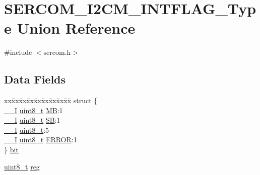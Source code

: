 \hypertarget{union_s_e_r_c_o_m___i2_c_m___i_n_t_f_l_a_g___type}{}\section{S\+E\+R\+C\+O\+M\+\_\+\+I2\+C\+M\+\_\+\+I\+N\+T\+F\+L\+A\+G\+\_\+\+Type Union Reference}
\label{union_s_e_r_c_o_m___i2_c_m___i_n_t_f_l_a_g___type}


{\ttfamily \#include $<$sercom.\+h$>$}

\subsection*{Data Fields}
\begin{DoxyCompactItemize}
\item 
\begin{tabbing}
xx\=xx\=xx\=xx\=xx\=xx\=xx\=xx\=xx\=\kill
struct \{\\
\>\mbox{\hyperlink{core__cm0plus_8h_af63697ed9952cc71e1225efe205f6cd3}{\_\_I}} \mbox{\hyperlink{union_s_e_r_c_o_m___i2_c_m___i_n_t_f_l_a_g___type_a5b4208c6f4c4a4290c4f2804d1eb1d5b}{uint8\_t}} \mbox{\hyperlink{union_s_e_r_c_o_m___i2_c_m___i_n_t_f_l_a_g___type_a0301020d471a9e6fd068eeee88394fe8}{MB}}:1\\
\>\mbox{\hyperlink{core__cm0plus_8h_af63697ed9952cc71e1225efe205f6cd3}{\_\_I}} \mbox{\hyperlink{union_s_e_r_c_o_m___i2_c_m___i_n_t_f_l_a_g___type_a5b4208c6f4c4a4290c4f2804d1eb1d5b}{uint8\_t}} \mbox{\hyperlink{union_s_e_r_c_o_m___i2_c_m___i_n_t_f_l_a_g___type_ac6add1ec2bf6a0ae4dce09e4829d4ef0}{SB}}:1\\
\>\mbox{\hyperlink{core__cm0plus_8h_af63697ed9952cc71e1225efe205f6cd3}{\_\_I}} \mbox{\hyperlink{union_s_e_r_c_o_m___i2_c_m___i_n_t_f_l_a_g___type_a5b4208c6f4c4a4290c4f2804d1eb1d5b}{uint8\_t}}:5\\
\>\mbox{\hyperlink{core__cm0plus_8h_af63697ed9952cc71e1225efe205f6cd3}{\_\_I}} \mbox{\hyperlink{union_s_e_r_c_o_m___i2_c_m___i_n_t_f_l_a_g___type_a5b4208c6f4c4a4290c4f2804d1eb1d5b}{uint8\_t}} \mbox{\hyperlink{union_s_e_r_c_o_m___i2_c_m___i_n_t_f_l_a_g___type_ab083f63120ce20369e2dbb0081da16e3}{ERROR}}:1\\
\} \mbox{\hyperlink{union_s_e_r_c_o_m___i2_c_m___i_n_t_f_l_a_g___type_a4821bdfc65e3873048e7d47e3204d670}{bit}}\\

\end{tabbing}\item 
\mbox{\hyperlink{union_s_e_r_c_o_m___i2_c_m___i_n_t_f_l_a_g___type_a5b4208c6f4c4a4290c4f2804d1eb1d5b}{uint8\+\_\+t}} \mbox{\hyperlink{union_s_e_r_c_o_m___i2_c_m___i_n_t_f_l_a_g___type_a9428adc9af4653a2050e2536b55dec8d}{reg}}
\end{DoxyCompactItemize}


